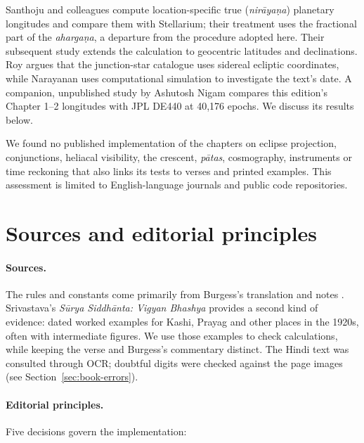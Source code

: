 \documentclass[11pt,a4paper]{article}
\begin{document}
Santhoju and colleagues \citep{santhoju2025} compute location-specific true (\textit{nir\={a}ya\d{n}a}) planetary longitudes and compare them with Stellarium; their treatment uses the fractional part of the \textit{aharga\d{n}a}, a departure from the procedure adopted here. Their subsequent study \citep{santhoju2026} extends the calculation to geocentric latitudes and declinations. Roy \citep{roy2019} argues that the junction-star catalogue uses sidereal ecliptic coordinates, while Narayanan \citep{narayanan2010} uses computational simulation to investigate the text's date. A companion, unpublished study by Ashutosh Nigam \citep{nigam2026de440} compares this edition's Chapter 1--2 longitudes with JPL DE440 \citep{park2021} at 40,176 epochs. We discuss its results below.

We found no published implementation of the chapters on eclipse projection, conjunctions, heliacal visibility, the crescent, \textit{p\={a}tas}, cosmography, instruments or time reckoning that also links its tests to verses and printed examples. This assessment is limited to English-language journals and public code repositories.

\section{Sources and editorial principles}
\label{sec:principles}

\paragraph{Sources.} The rules and constants come primarily from Burgess's translation and notes \citep{burgess1860}. Srivastava's \textit{S\={u}rya Siddh\={a}nta: Vigyan Bhashya} \citep{srivastava} provides a second kind of evidence: dated worked examples for Kashi, Prayag and other places in the 1920s, often with intermediate figures. We use those examples to check calculations, while keeping the verse and Burgess's commentary distinct. The Hindi text was consulted through OCR; doubtful digits were checked against the page images (see Section~\ref{sec:book-errors}).

\paragraph{Editorial principles.} Five decisions govern the implementation:
\end{document}
